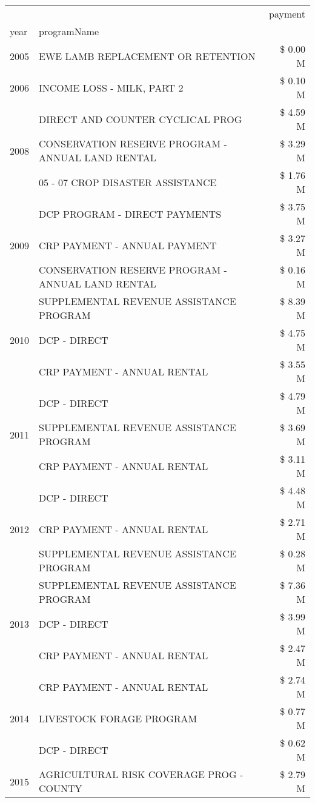 \begin{tabular}{llr}
\toprule
 &  & payment \\
year & programName &  \\
\midrule
2005 & EWE LAMB REPLACEMENT OR RETENTION & \$ 0.00 M \\
\cline{1-3}
2006 & INCOME LOSS - MILK, PART 2 & \$ 0.10 M \\
\cline{1-3}
\multirow[t]{3}{*}{2008} & DIRECT AND COUNTER CYCLICAL PROG & \$ 4.59 M \\
 & CONSERVATION RESERVE PROGRAM - ANNUAL LAND RENTAL & \$ 3.29 M \\
 & 05 - 07 CROP DISASTER ASSISTANCE & \$ 1.76 M \\
\cline{1-3}
\multirow[t]{3}{*}{2009} & DCP PROGRAM - DIRECT PAYMENTS & \$ 3.75 M \\
 & CRP PAYMENT - ANNUAL PAYMENT & \$ 3.27 M \\
 & CONSERVATION RESERVE PROGRAM - ANNUAL LAND RENTAL & \$ 0.16 M \\
\cline{1-3}
\multirow[t]{3}{*}{2010} & SUPPLEMENTAL REVENUE ASSISTANCE PROGRAM & \$ 8.39 M \\
 & DCP - DIRECT & \$ 4.75 M \\
 & CRP PAYMENT - ANNUAL RENTAL & \$ 3.55 M \\
\cline{1-3}
\multirow[t]{3}{*}{2011} & DCP - DIRECT & \$ 4.79 M \\
 & SUPPLEMENTAL REVENUE ASSISTANCE PROGRAM & \$ 3.69 M \\
 & CRP PAYMENT - ANNUAL RENTAL & \$ 3.11 M \\
\cline{1-3}
\multirow[t]{3}{*}{2012} & DCP - DIRECT & \$ 4.48 M \\
 & CRP PAYMENT - ANNUAL RENTAL & \$ 2.71 M \\
 & SUPPLEMENTAL REVENUE ASSISTANCE PROGRAM & \$ 0.28 M \\
\cline{1-3}
\multirow[t]{3}{*}{2013} & SUPPLEMENTAL REVENUE ASSISTANCE PROGRAM & \$ 7.36 M \\
 & DCP - DIRECT & \$ 3.99 M \\
 & CRP PAYMENT - ANNUAL RENTAL & \$ 2.47 M \\
\cline{1-3}
\multirow[t]{3}{*}{2014} & CRP PAYMENT - ANNUAL RENTAL & \$ 2.74 M \\
 & LIVESTOCK FORAGE PROGRAM & \$ 0.77 M \\
 & DCP - DIRECT & \$ 0.62 M \\
\cline{1-3}
\multirow[t]{3}{*}{2015} & AGRICULTURAL RISK COVERAGE PROG - COUNTY & \$ 2.79 M \\

\end{tabular}
